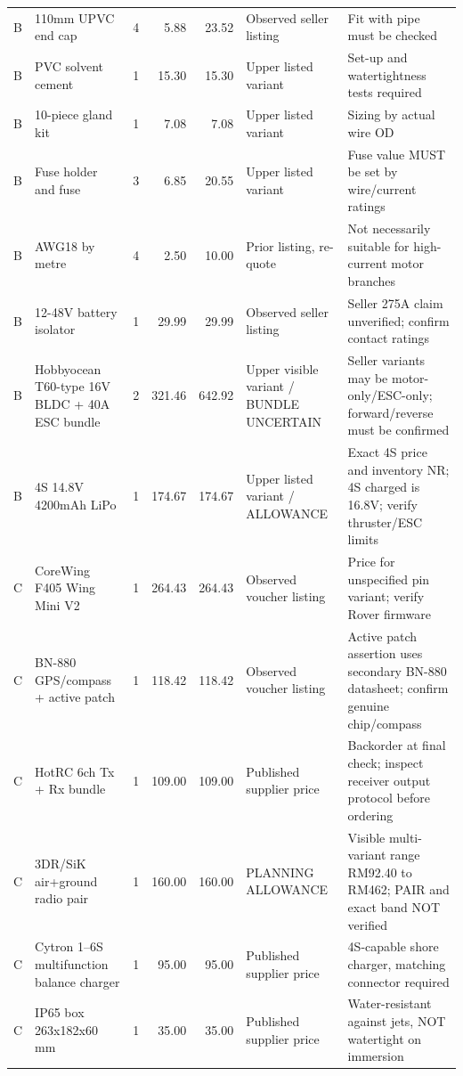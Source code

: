 \begin{longtable}{L{12mm}L{47mm}r r r L{31mm}L{36mm}}
B & 110mm UPVC end cap \cite{cap} & 4 & 5.88 & 23.52 & Observed seller listing & Fit with pipe must be checked \\
B & PVC solvent cement \cite{glue} & 1 & 15.30 & 15.30 & Upper listed variant & Set-up and watertightness tests required \\
B & 10-piece gland kit \cite{gland} & 1 & 7.08 & 7.08 & Upper listed variant & Sizing by actual wire OD \\
B & Fuse holder and fuse \cite{fuse} & 3 & 6.85 & 20.55 & Upper listed variant & Fuse value MUST be set by wire/current ratings \\
B & AWG18 by metre \cite{wire} & 4 & 2.50 & 10.00 & Prior listing, re-quote & Not necessarily suitable for high-current motor branches \\
B & 12-48V battery isolator \cite{kill} & 1 & 29.99 & 29.99 & Observed seller listing & Seller 275A claim unverified; confirm contact ratings \\
B & Hobbyocean T60-type 16V BLDC + 40A ESC bundle \cite{hobbyShop} & 2 & 321.46 & 642.92 & Upper visible variant / BUNDLE UNCERTAIN & Seller variants may be motor-only/ESC-only; forward/reverse must be confirmed \\
B & 4S 14.8V 4200mAh LiPo \cite{bat4Shopee} & 1 & 174.67 & 174.67 & Upper listed variant / ALLOWANCE & Exact 4S price and inventory NR; 4S charged is 16.8V; verify thruster/ESC limits \\
C & CoreWing F405 Wing Mini V2 \cite{coreShop} & 1 & 264.43 & 264.43 & Observed voucher listing & Price for unspecified pin variant; verify Rover firmware \\
C & BN-880 GPS/compass + active patch \cite{bnShop} & 1 & 118.42 & 118.42 & Observed voucher listing & Active patch assertion uses secondary BN-880 datasheet; confirm genuine chip/compass \\
C & HotRC 6ch Tx + Rx bundle \cite{hotrc} & 1 & 109.00 & 109.00 & Published supplier price & Backorder at final check; inspect receiver output protocol before ordering \\
C & 3DR/SiK air+ground radio pair \cite{radioShop} & 1 & 160.00 & 160.00 & PLANNING ALLOWANCE & Visible multi-variant range RM92.40 to RM462; PAIR and exact band NOT verified \\
C & Cytron 1--6S multifunction balance charger \cite{charger4} & 1 & 95.00 & 95.00 & Published supplier price & 4S-capable shore charger, matching connector required \\
C & IP65 box 263x182x60 mm \cite{box} & 1 & 35.00 & 35.00 & Published supplier price & Water-resistant against jets, NOT watertight on immersion \\

\end{longtable}

